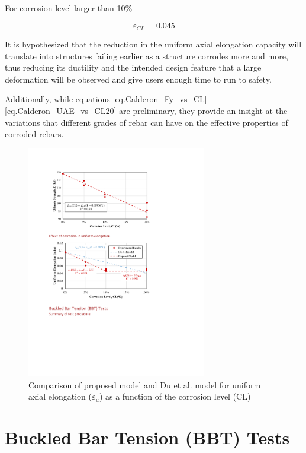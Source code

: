 For corrosion level larger than 10\%

\begin{equation}
    \varepsilon_{CL} = 0.045
    \label{eq.Calderon_UAE_vs_CL20}
\end{equation}

It is hypothesized that the reduction in the uniform axial elongation capacity will translate into structures failing earlier as a structure corrodes more and more, thus reducing its ductility and the intended design feature that a large deformation will be observed and give users enough time to run to safety.

Additionally, while equations \ref{eq.Calderon_Fy_vs_CL} - \ref{eq.Calderon_UAE_vs_CL20} are preliminary, they provide an insight at the variations that different grades of rebar can have on the effective properties of corroded rebars.

\begin{figure}[htbp]
	\centering
	\includegraphics[width=0.7\textwidth]{VAC Thesis 2.0/Chapter-4/figs/TensionTest_results_4_proposedmodel.pdf}
	\caption{Comparison of proposed model and Du et al. model \cite{Du2005} for uniform axial elongation ($\varepsilon_u$) as a function of the corrosion level (CL)}
	\label{fig:UAE_vs_CL}
\end{figure}

\section{Buckled Bar Tension (BBT) Tests}
